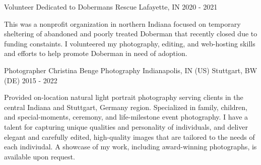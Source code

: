 \vspace{-0.5em}


\begin{cventries}
	
	

\cventry
{Volunteer}
{Dedicated to Dobermans Rescue} %
{Lafayette, IN}
{2020 - 2021} %
{ %
	\begin{cvitems}
		\item {This was a nonprofit organization in northern Indiana focused on temporary sheltering of abandoned and poorly treated Doberman that recently closed due to funding constaints.  I volunteered my photography, editing, and web-hosting skills and efforts to help promote Doberman in need of adoption.}
	\end{cvitems}
}


\cventry
{Photographer} %
{Christina Benge Photography} %
{Indianapolis, IN (US) Stuttgart, BW (DE)} %
{2015 - 2022} %
{ %
	\begin{cvitems}
		\item {Provided on-location natural light portrait photography serving clients in the central Indiana and Stuttgart, Germany region.  Specialized in family, children, and special-moments, ceremony, and life-milestone event photography.  I have a talent for capturing unique qualities and personality of individuals, and deliver elegant and carefully edited, high-quality images that are tailored to the needs of each indiviudal.  A showcase of my work, including award-winning photographs, is available upon request.}
	\end{cvitems}
}


\end{cventries}